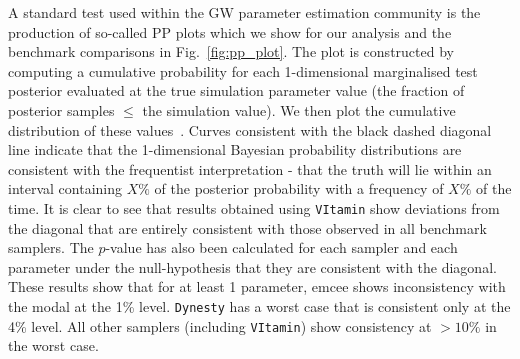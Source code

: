 %
%
A standard test used within the \ac{GW} parameter estimation community is the
production of so-called \ac{PP} plots which we show for our analysis and
the benchmark comparisons in Fig.~\ref{fig:pp_plot}. The plot is constructed
by computing a cumulative probability for each 1-dimensional marginalised
test posterior evaluated at the true simulation parameter value (the fraction
of posterior samples $\leq$ the simulation value). We then plot the
cumulative distribution of these values~\cite{1409.7215}. Curves consistent
with the black dashed diagonal line indicate that the 1-dimensional Bayesian
probability distributions are consistent with the frequentist interpretation -
that the truth will lie within an interval containing $X\%$ of the posterior
probability with a frequency of $X\%$ of the time. It is clear to see that
results obtained using \texttt{VItamin} show deviations from the diagonal
that are entirely consistent with those observed in all benchmark samplers.
The $p$-value has also been calculated for each sampler and each parameter
under the null-hypothesis that they are consistent with the diagonal. These
results show that for at least 1 parameter, emcee shows inconsistency with the
modal at the 1\% level. \texttt{Dynesty} has a worst case that is consistent only at the
4\% level.  All other samplers (including \texttt{VItamin}) show consistency at
$>10\%$ in the worst case.     

%
%
%

